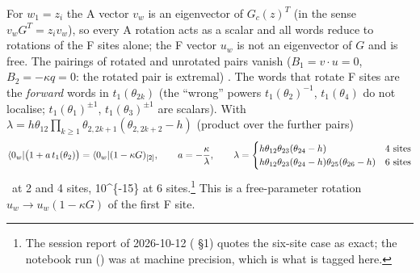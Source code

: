 For $w_1=z_i$ the A vector $v_w$ is an eigenvector of $G_c(z)^T$ (in the sense $v_wG^T=z_iv_w$), so every A rotation acts as a scalar and all words reduce to
rotations of the F sites alone; the F vector $u_w$ is not an eigenvector of $G$ and is free. The pairings of rotated and unrotated pairs vanish ($B_1=v\cdot u=0$, $B_2=-\kappa q=0$: the
rotated pair is extremal) \ex. The words that rotate F sites are the \emph{forward} words in $t_1(\theta_{2k})$ (the ``wrong'' powers $t_1(\theta_2)^{-1}$, $t_1(\theta_4)$ do not localise; $t_1(\theta_1)^{\pm1}$,
$t_1(\theta_3)^{\pm1}$ are scalars). With $\lambda=h\theta_{12}\prod_{k\ge1}\theta_{2,2k+1}(\theta_{2,2k+2}-h)$ (product over the further pairs)
\begin{equation}
 \langle0_w|\big(1+a\,t_1(\theta_2)\big)=\langle0_w|(1-\kappa G)_{[2]},\qquad a=-\frac\kappa\lambda,\qquad
 \lambda=\begin{cases}h\theta_{12}\theta_{23}(\theta_{24}-h)&\text{4 sites}\\ h\theta_{12}\theta_{23}(\theta_{24}-h)\theta_{25}(\theta_{26}-h)&\text{6 sites}\end{cases}
\end{equation}
\ex\ at 2 and 4 sites, \num{10^{-15}} at 6 sites.\footnote{The session report of 2026-10-12 ( \S1) quotes
the six-site case as exact; the notebook run () was at machine precision, which is what is tagged here.} This is a free-parameter rotation $u_w\to u_w(1-\kappa G)$ of the first F site.

